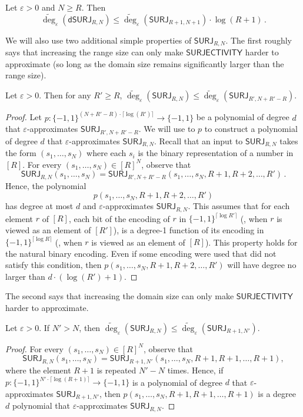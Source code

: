 \documentclass{toc}
\newcommand{\SURJ}{\mathsf{ SURJ}}
\newcommand{\dumSURJ}{\mathsf{dSURJ}}
\newcommand{\bits}{\{-1,1\}}
\newcommand{\eps}{\varepsilon}
\newcommand{\adeg}{\widetilde{\operatorname{deg}}}
\begin{document}
\begin{proposition} \label{prop:dumsurj-reduction} \label{relatingdsurjtosurj}
	Let $\eps > 0$ and $N \ge R$. Then
	\[ \adeg_\eps(\dumSURJ_{R, N}) \le \adeg_\eps(\SURJ_{R + 1, N + 1}) \cdot \log(R+1)\,.\]
\end{proposition}

We will also use two additional simple properties of $\SURJ_{R, N}$. The first roughly says
that increasing the range size can only make $\mathsf{SURJECTIVITY}$ harder to approximate (so long as the domain
size remains significantly larger than the range size).

\begin{proposition} \label{yoursurjprop}
	Let $\eps > 0$. Then for any $R' \geq R$, $\adeg_{\eps}(\SURJ_{R, N}) \leq \adeg_{\eps}(\SURJ_{R', N + R' - R})$. 
\end{proposition}
\begin{proof}
	Let $p : \bits^{(N+R'-R) \cdot \lceil\log(R')\rceil} \to \bits$ be a polynomial of degree $d$ that $\eps$-approximates $\SURJ_{R', N +R' - R}$. We will use to $p$ to construct a polynomial of degree $d$ that $\eps$-approximates $\SURJ_{R, N}$. Recall that an input to $\SURJ_{R, N}$ takes the form $(s_1, \dots, s_N)$ where each $s_i$ is the binary representation of a number in $[R]$. 
	For every $(s_1, \dots, s_N) \in [R]^N$, observe that
	\[\SURJ_{R, N}(s_1, \dots, s_N) = \SURJ_{R', N+R'-R}(s_1, \dots, s_N, R+1, R+2, \dots, R')\,.\]
	Hence, the polynomial
	\[p(s_1, \dots, s_N, R+1, R+2, \dots, R')\]
	has degree at most $d$ and $\eps$-approximates $\SURJ_{R, N}$. This assumes
	that for each element $r$ of $[R]$, each bit of the encoding of $r$ in $\bits^{\lceil\log R'\rceil}$ (\ie, when $r$ is viewed as an element of $[R']$),
	is a degree-1 function of its encoding in $\bits^{\lceil \log R \rceil}$ (\ie, when $r$ is viewed as an element of $[R]$). This property 
	holds for the natural binary encoding. Even if some encoding were used that did not satisfy this %
	condition, %
	then $p(s_1, \dots, s_N, R+1, R+2, \dots, R')$ will have degree no larger than $d \cdot (\log(R') + 1)$.
\end{proof}

The second says that increasing the domain size can only make $\mathsf{SURJECTIVITY}$ harder to approximate. 
\begin{proposition} \label{yoursurjprop2}
	Let $\eps > 0$. If $N' > N$, then $\adeg_{\eps}(\SURJ_{R, N})  \leq \adeg_{\eps}(\SURJ_{R+1, N'})$.
\end{proposition}
\begin{proof}
	For every $(s_1, \dots, s_N) \in [R]^N$, observe that
	\[\SURJ_{R, N}(s_1, \dots, s_N) = \SURJ_{R+1, N'}(s_1, \dots, s_N, R+1, R+1, \dots, R+1),\]
	where the element $R+1$ is repeated $N'-N$ times. 
	Hence, if $p : \bits^{N' \cdot \lceil \log(R+1) \rceil} \to \bits$ is a polynomial of degree $d$ that $\eps$-approximates $\SURJ_{R+1, N'}$,
	then $p(s_1, \dots, s_N, R+1, R+1, \dots, R+1)$ is a degree $d$ polynomial that $\eps$-approximates $\SURJ_{R, N}$.
\end{proof}
\end{document}
